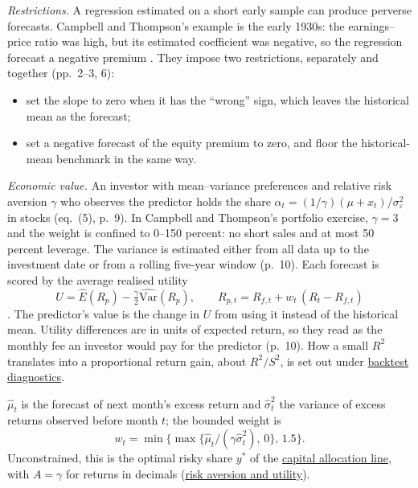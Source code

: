 \begin{qfmethod}\label{meth:restricted-forecast-value}
 \emph{Restrictions.} A regression estimated on a short early sample can produce perverse forecasts. Campbell and Thompson's example is the early 1930s: the earnings--price ratio was high, but its estimated coefficient was negative, so the regression forecast a negative premium \citep[NBER WP 11468, p.~6]{campbell-thompson-2005-nber}. They impose two restrictions, separately and together (pp.~2--3, 6):
\begin{itemize}
\item set the slope to zero when it has the ``wrong'' sign, which leaves the historical mean as the forecast;
\item set a negative forecast of the equity premium to zero, and floor the historical-mean benchmark in the same way.
\end{itemize}

\emph{Economic value.} An investor with mean--variance preferences and relative risk aversion $\gamma$ who observes the predictor holds the share $\alpha_t=(1/\gamma)(\mu+x_t)/\sigma_\varepsilon^2$ in stocks (eq.~(5), p.~9). In Campbell and Thompson's portfolio exercise, $\gamma=3$ and the weight is confined to 0--150 percent: no short sales and at most 50 percent leverage. The variance is estimated either from all data up to the investment date or from a rolling five-year window (p.~10). Each forecast is scored by the average realised utility
\[ U=\widehat E(R_p)-\tfrac{\gamma}{2}\widehat{\mathrm{Var}}(R_p),\qquad R_{p,t}=R_{f,t}+w_t\,(R_t-R_{f,t}) \]
\citep[Table~2 notes, unnumbered table page]{campbell-thompson-2005-nber}. The predictor's value is the change in $U$ from using it instead of the historical mean. Utility differences are in units of expected return, so they read as the monthly fee an investor would pay for the predictor (p.~10). How a small $R^2$ translates into a proportional return gain, about $R^2/S^2$, is set out under \hyperref[meth:backtest-evaluation-diagnostics]{backtest diagnostics}.

 $\hat\mu_t$ is the forecast of next month's excess return and $\hat\sigma_t^2$ the variance of excess returns observed before month $t$; the bounded weight is
\[ w_t=\min\bigl\{\max\{\hat\mu_t/(\gamma\hat\sigma_t^2),\,0\},\,1.5\bigr\}. \]
Unconstrained, this is the optimal risky share $y^\ast$ of the \hyperref[meth:capital-allocation-line]{capital allocation line}, with $A=\gamma$ for returns in decimals (\hyperref[def:risk-aversion-utility]{risk aversion and utility}).


\end{qfmethod}
